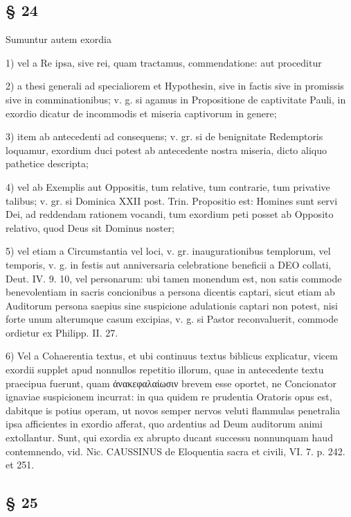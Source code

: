 \subsection{§ 24}

Sumuntur autem exordia

1) vel a Re ipsa, sive rei, quam tractamus, commendatione: aut proceditur

2) a thesi generali ad specialiorem et Hypothesin, sive in factis sive in promissis sive in comminationibus; v. g. si agamus in Propositione de captivitate Pauli, in exordio dicatur de incommodis et miseria captivorum in genere;

3) item ab antecedenti ad consequens; v. gr. si de benignitate Redemptoris loquamur, exordium duci potest ab antecedente nostra miseria, dicto aliquo pathetice descripta;

4) vel ab Exemplis aut Oppositis, tum relative, tum contrarie, tum privative talibus; v. gr. si Dominica XXII post. Trin. Propositio est: Homines sunt servi Dei, ad reddendam rationem vocandi, tum exordium peti posset ab Opposito relativo, quod Deus sit Dominus noster;

5) vel etiam a Circumstantia vel loci, v. gr. inaugurationibus templorum, vel temporis, v. g. in festis aut anniversaria celebratione beneficii a DEO collati, Deut. IV. 9. 10, vel personarum: ubi tamen monendum est, non satis commode benevolentiam in sacris concionibus a persona dicentis captari, sicut etiam ab Auditorum persona saepius sine suspicione adulationis captari non potest, nisi forte unum alterumque casum excipias, v. g. si Pastor reconvaluerit, commode ordietur ex Philipp. II. 27.

6) Vel a Cohaerentia textus, et ubi continuus textus biblicus explicatur, vicem exordii supplet apud nonnullos repetitio illorum, quae in antecedente textu praecipua fuerunt, quam ἀνακεφαλαίωσιν brevem esse oportet, ne Concionator ignaviae suspicionem incurrat: in qua quidem re prudentia Oratoris opus est, dabitque is potius operam, ut novos semper nervos veluti flammulas penetralia ipsa afficientes in exordio afferat, quo ardentius ad Deum auditorum animi extollantur. Sunt, qui exordia ex abrupto ducant successu nonnunquam haud contemnendo, vid. Nic. CAUSSINUS de Eloquentia sacra et civili, VI. 7. p. 242. et 251.

\subsection{§ 25}

